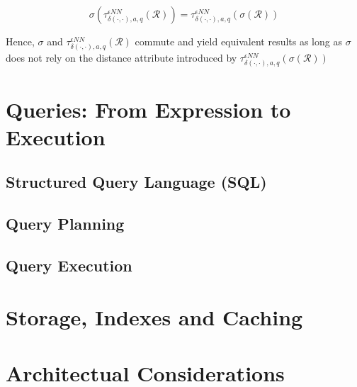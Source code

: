 \begin{equation}
    \sigma(\tau^{\epsilon NN}_{\delta(\cdot,\cdot),a,q}(\mathcal{R})) = \tau^{\epsilon NN}_{\delta(\cdot,\cdot),a,q}(\sigma(\mathcal{R}))
\end{equation}

Hence, $\sigma$ and $\tau^{\epsilon NN}_{\delta(\cdot,\cdot),a,q}(\mathcal{R})$ commute and yield equivalent results as long as $\sigma$ does not rely on the distance attribute introduced by $\tau^{\epsilon NN}_{\delta(\cdot,\cdot),a,q}(\sigma(\mathcal{R}))$

\section{Queries: From Expression to Execution}

\subsection{Structured Query Language (SQL)}

\subsection{Query Planning}

\subsection{Query Execution}

\section{Storage, Indexes and Caching}

\section{Architectual Considerations}